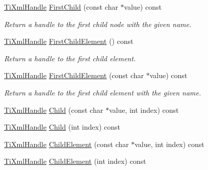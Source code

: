 \begin{DoxyCompactItemize}
\mbox{\label{class_ti_xml_handle_a586ebaca4a4d0909db65a765d95d5e59}} 
\hyperlink{class_ti_xml_handle}{Ti\+Xml\+Handle} \hyperlink{class_ti_xml_handle_a586ebaca4a4d0909db65a765d95d5e59}{First\+Child} (const char $\ast$value) const
\begin{DoxyCompactList}\small\item\em Return a handle to the first child node with the given name. \end{DoxyCompactList}\item 
\mbox{\label{class_ti_xml_handle_af0643f8683f3f2b779b8c9d78c67b2c0}} 
\hyperlink{class_ti_xml_handle}{Ti\+Xml\+Handle} \hyperlink{class_ti_xml_handle_af0643f8683f3f2b779b8c9d78c67b2c0}{First\+Child\+Element} () const
\begin{DoxyCompactList}\small\item\em Return a handle to the first child element. \end{DoxyCompactList}\item 
\mbox{\label{class_ti_xml_handle_a3eaf2d2d4c087cd8a48da261042e75bc}} 
\hyperlink{class_ti_xml_handle}{Ti\+Xml\+Handle} \hyperlink{class_ti_xml_handle_a3eaf2d2d4c087cd8a48da261042e75bc}{First\+Child\+Element} (const char $\ast$value) const
\begin{DoxyCompactList}\small\item\em Return a handle to the first child element with the given name. \end{DoxyCompactList}\item 
\hyperlink{class_ti_xml_handle}{Ti\+Xml\+Handle} \hyperlink{class_ti_xml_handle_a9903b035444ee36450fe00ede403f920}{Child} (const char $\ast$value, int index) const
\item 
\hyperlink{class_ti_xml_handle}{Ti\+Xml\+Handle} \hyperlink{class_ti_xml_handle_a32585942abb28e03eea9c5223f38a659}{Child} (int index) const
\item 
\hyperlink{class_ti_xml_handle}{Ti\+Xml\+Handle} \hyperlink{class_ti_xml_handle_afccc59d8a0daa8c5d78474fbed430ddb}{Child\+Element} (const char $\ast$value, int index) const
\item 
\hyperlink{class_ti_xml_handle}{Ti\+Xml\+Handle} \hyperlink{class_ti_xml_handle_a57a639ab0ac99ff9358f675a1b73049a}{Child\+Element} (int index) const
\item 
\mbox{\label{class_ti_xml_handle_afd813aae06c0449b04ccf0237076495e}} 

\end{DoxyCompactItemize}

